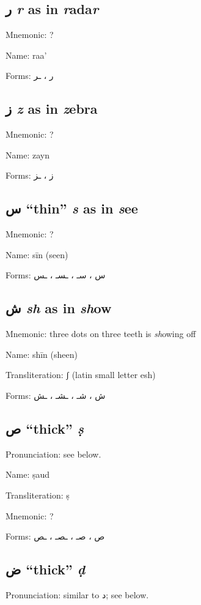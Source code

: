 \documentclass[11pt]{article}
\begin{document}
\subsection{ \textarabic{ر} \textit{r} as in \textit{r}ada\textit{r}}
Mnemonic:  ?

\noindent Name: raa'

\noindent Forms: \textarabic{ر ، ـر}

\subsection{ \textarabic{ز} \textit{z} as in \textit{z}ebra}
Mnemonic:  ?

\noindent Name: zayn

\noindent Forms: \textarabic{ز ، ـز}

\subsection{ \textarabic{س} ``thin'' \textit{s} as in \textit{s}ee}
Mnemonic:  ?

\noindent Name: sīn (seen)

\noindent Forms: \textarabic{س ، سـ ، ـسـ ، ـس}

\subsection{ \textarabic{ش} \textit{sh} as in \textit{sh}ow}
Mnemonic:  three dots on three teeth is \textit{sh}owing off

\noindent Name: shīn (sheen)

\noindent Transliteration: ʃ (latin small letter esh)

\noindent Forms: \textarabic{ش ، شـ ، ـشـ ، ـش}

\subsection{ \textarabic{ص} ``thick'' \textit{ṣ}}
Pronunciation: see below.

\noindent Name: ṣaud

\noindent Transliteration: ṣ

\noindent Mnemonic:  ?

\noindent Forms: \textarabic{ص ، صـ ، ـصـ ، ـص}

\subsection{ \textarabic{ض} ``thick'' \textit{ḍ}}
Pronunciation: similar to \textarabic{د}; see below.
\end{document}
